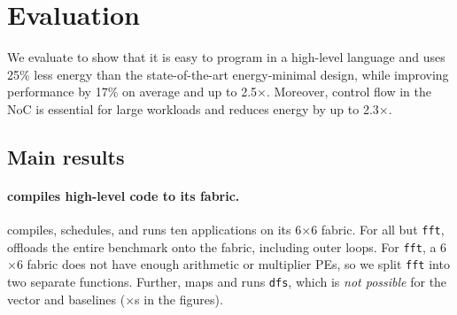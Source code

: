 \section{Evaluation}
\label{sec:eval}

\figRipTideEnergyResults

\figRipTidePerformanceResults

We evaluate \riptide to show that it is easy to program in a high-level language
and uses 25\% less energy than the state-of-the-art energy-minimal design,
while improving performance by 17\% on average and up to 2.5$\times$.
Moreover, control flow in the NoC is essential for large
workloads and reduces energy by up to 2.3$\times$. %


\subsection{Main results}

\paragraph{\riptide compiles high-level code to its fabric.} \riptide
compiles, schedules, and runs ten applications on its 6$\times$6 fabric.
% 
For all but {\tt fft}, \riptide offloads the entire benchmark onto the fabric, including
outer loops.
% 
For {\tt fft}, a 6$\times$6 fabric does not have enough arithmetic or multiplier PEs,
so we split {\tt fft} into two separate functions. %
% 
Further, \riptide maps and runs {\tt dfs}, which is {\em not possible} for
the vector and \snafu baselines ($\times$s in the figures).

